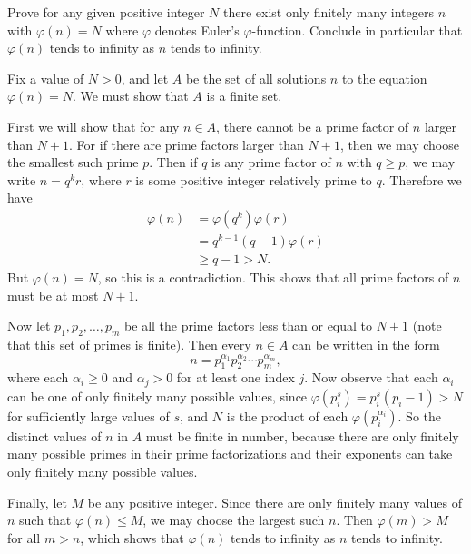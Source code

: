  Prove for any given positive integer $N$ there exist
only finitely many integers $n$ with $\varphi(n) = N$ where $\varphi$
denotes Euler's $\varphi$-function. Conclude in particular that
$\varphi(n)$ tends to infinity as $n$ tends to infinity.
\begin{solution}
  Fix a value of $N>0$, and let $A$ be the set of all solutions $n$ to
  the equation $\varphi(n) = N$. We must show that $A$ is a finite
  set.

  First we will show that for any $n\in A$, there cannot be a prime
  factor of $n$ larger than $N + 1$. For if there are prime factors
  larger than $N + 1$, then we may choose the smallest such prime
  $p$. Then if $q$ is any prime factor of $n$ with $q\geq p$, we may
  write $n = q^kr$, where $r$ is some positive integer relatively
  prime to $q$. Therefore we have
  \begin{align*}
    \varphi(n) &= \varphi(q^k)\varphi(r) \\
               &= q^{k-1}(q - 1)\varphi(r) \\
               &\geq q - 1 > N.
  \end{align*}
  But $\varphi(n) = N$, so this is a contradiction. This shows that
  all prime factors of $n$ must be at most $N + 1$.

  Now let $p_1, p_2, \ldots, p_m$ be all the prime factors less than
  or equal to $N + 1$ (note that this set of primes is finite). Then
  every $n\in A$ can be written in the form
  \begin{equation*}
    n = p_1^{\alpha_1}p_2^{\alpha_2}\cdots p_m^{\alpha_m},
  \end{equation*}
  where each $\alpha_i\geq 0$ and $\alpha_j > 0$ for at least one
  index $j$. Now observe that each $\alpha_i$ can be one of only
  finitely many possible values, since
  $\varphi(p_i^s) = p_i^s(p_i - 1) > N$ for sufficiently large values
  of $s$, and $N$ is the product of each $\varphi(p_i^{\alpha_i})$. So
  the distinct values of $n$ in $A$ must be finite in number, because
  there are only finitely many possible primes in their prime
  factorizations and their exponents can take only finitely many
  possible values.

  Finally, let $M$ be any positive integer. Since there are only
  finitely many values of $n$ such that $\varphi(n) \leq M$, we may
  choose the largest such $n$. Then $\varphi(m) > M$ for all $m>n$,
  which shows that $\varphi(n)$ tends to infinity as $n$ tends to
  infinity.
\end{solution}

